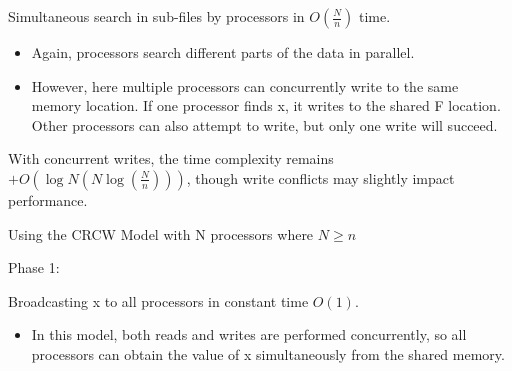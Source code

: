 \documentclass[a4paper, 10pt]{book}
\begin{document}
\begin{tcolorbox}[colback=white, colframe=black!25, title=Example]
\begin{minipage}{0.49\linewidth}
\begin{tcolorbox}[colframe=white, size=small]
                                Simultaneous search in sub-files by processors in $O(\frac{N}{n})$ time.
    
                                \begin{itemize}
                                    
                                    \item Again, processors search different parts of the data in parallel.
                                    
                                    \item However, here multiple processors can concurrently write to the same memory location. If one processor finds x, it writes to the shared F location. Other processors can also attempt to write, but only one write will succeed.
    
                                \end{itemize}
    
                                With concurrent writes, the time complexity remains $+O(\log N(N \log(\frac{N}{n})))$, though write conflicts may slightly impact performance.
    
                            \end{tcolorbox}
                        \end{minipage}
                        \hfill
                        \begin{minipage}{0.49\linewidth} %
                            \footnotesize
                            \vspace{0.3cm}
                            \begin{tcolorbox}[colframe=white, size=small]
                                
                                {\bold Using the CRCW Model with N processors where $N\geq n$}
    
                                {\bold Phase 1:}
                                
                                Broadcasting x to all processors in constant time $O(1)$.
    
                                \begin{itemize}
                                    
                                    \item In this model, both reads and writes are performed concurrently, so all processors can obtain the value of x simultaneously from the shared memory.
    

\end{itemize}
\end{tcolorbox}
\end{minipage}
\end{tcolorbox}
\end{document}
